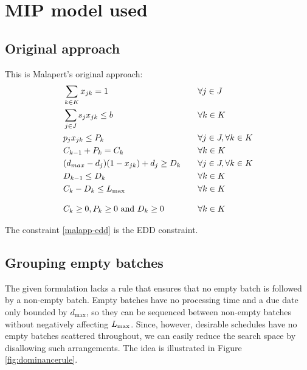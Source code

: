 \documentclass[13pt, letterpaper, twoside]{book}
\begin{document}
%
%
%
%
%
%
%

\section{MIP model used}
\subsection{Original approach}
This is Malapert's original approach:
\begin{alignat}{2}
  &\sum_{k \in K} x_{jk} = 1 \quad && \forall j \in J \\
  &\sum_{j \in J} s_j x_{jk} \leq b \quad && \forall k \in K\\
  &p_j x_{jk} \leq P_k \quad && \forall j \in J, \forall k \in K\\
  &C_{k-1} + P_{k} = C_k \quad && \forall k \in K\\
  &(d_{max} - d_j)(1 - x_{jk}) + d_j \geq D_k \quad && \forall j \in J, \forall k \in K\\
  &D_{k-1} \leq D_k \quad && \forall k \in K \label{malapp-edd} \\
  &C_k - D_k \leq L_{\text{max}} \quad && \forall k \in K\\[2ex]
  &C_k \geq 0, P_k \geq 0 \text{ and } D_k \geq 0 \quad && \forall k \in K  
\end{alignat}

The constraint \ref{malapp-edd} is the EDD constraint.

\subsection{Grouping empty batches}
The given formulation lacks a rule that ensures that no empty batch is followed by a non-empty batch. Empty batches have no processing time and a due date only bounded by $d_\text{max}$, so they can be sequenced between non-empty batches without negatively affecting $L_{\text{max}}$. Since, however, desirable schedules have no empty batches scattered throughout, we can easily reduce the search space by disallowing such arrangements. The idea is illustrated in Figure \ref{fig:dominancerule}.
\end{document}
